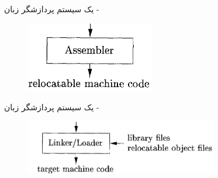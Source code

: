 \begin{frame}{یک سیستم پردازشگر زبان - }
\begin{figure}[H]
\begin{center}
\includegraphics[width=0.5\textwidth, height=0.5\textheight, angle=0.6]{docs/images/assembler}
\end{center}
\end{figure}
\end{frame}

\begin{frame}{یک سیستم پردازشگر زبان - }
\begin{figure}[H]
\begin{center}
\includegraphics[width=0.75\textwidth, height=0.5\textheight, angle=0.4]{docs/images/linkerloader}
\end{center}
\end{figure}
\end{frame}